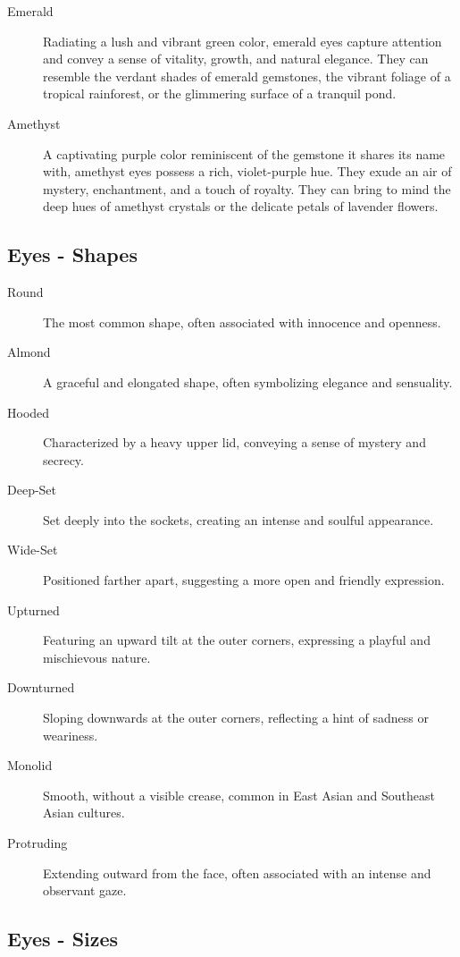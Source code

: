\documentclass[12pt]{book}  %
\begin{document}
\begin{description}
    \item[Emerald] Radiating a lush and vibrant green color, emerald eyes capture attention and convey a sense of vitality, growth, and natural elegance. They can resemble the verdant shades of emerald gemstones, the vibrant foliage of a tropical rainforest, or the glimmering surface of a tranquil pond.
    \item[Amethyst] A captivating purple color reminiscent of the gemstone it shares its name with, amethyst eyes possess a rich, violet-purple hue. They exude an air of mystery, enchantment, and a touch of royalty. They can bring to mind the deep hues of amethyst crystals or the delicate petals of lavender flowers.
\end{description}

\subsection{\textbf{Eyes - Shapes}}

\begin{description}
    \item[Round] The most common shape, often associated with innocence and openness.
    \item[Almond] A graceful and elongated shape, often symbolizing elegance and sensuality.
    \item[Hooded] Characterized by a heavy upper lid, conveying a sense of mystery and secrecy.
    \item[Deep-Set] Set deeply into the sockets, creating an intense and soulful appearance.
    \item[Wide-Set] Positioned farther apart, suggesting a more open and friendly expression.
    \item[Upturned] Featuring an upward tilt at the outer corners, expressing a playful and mischievous nature.
    \item[Downturned] Sloping downwards at the outer corners, reflecting a hint of sadness or weariness.
    \item[Monolid] Smooth, without a visible crease, common in East Asian and Southeast Asian cultures.
    \item[Protruding] Extending outward from the face, often associated with an intense and observant gaze.
\end{description}

\subsection{\textbf{Eyes - Sizes}}
\end{document}
